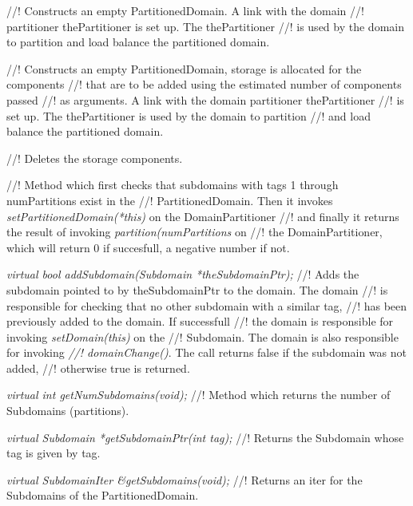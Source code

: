 //! Constructs an empty PartitionedDomain. A link with the domain
//! partitioner \p thePartitioner is set up. The \p thePartitioner
//! is used by the domain to partition and load balance the partitioned domain.

//! Constructs an empty PartitionedDomain, storage is allocated for the components
//! that are to be added using the estimated number of components passed
//! as arguments. A link with the domain partitioner \p thePartitioner
//! is set up. The \p thePartitioner is used by the domain to partition
//! and load balance the partitioned domain.


//! Deletes the storage components.

//! Method which first checks that subdomains with tags 1 through \p numPartitions exist in the 
//! PartitionedDomain. Then it invokes {\em setPartitionedDomain(*this)} on the DomainPartitioner
//! and finally it returns the result of invoking {\em partition(numPartitions} on
//! the DomainPartitioner, which will return 0 if succesfull, a negative number if not.

{\em virtual bool addSubdomain(Subdomain *theSubdomainPtr);}
//! Adds the subdomain pointed to by theSubdomainPtr to the domain. The domain
//! is responsible for checking that no other subdomain with a similar tag,
//! has been previously added to the domain. If successfull
//! the domain is responsible for invoking {\em setDomain(this)} on the
//! Subdomain. The domain is also responsible for invoking {\em
//! domainChange()}. The call returns \p false if the subdomain was not added, 
//! otherwise \p true is returned.  

{\em virtual int getNumSubdomains(void);}
//! Method which returns the number of Subdomains (partitions).

{\em virtual Subdomain *getSubdomainPtr(int tag);}
//! Returns the Subdomain whose tag is given by \p tag.

{\em virtual SubdomainIter \&getSubdomains(void);}
//! Returns an iter for the Subdomains of the PartitionedDomain.


